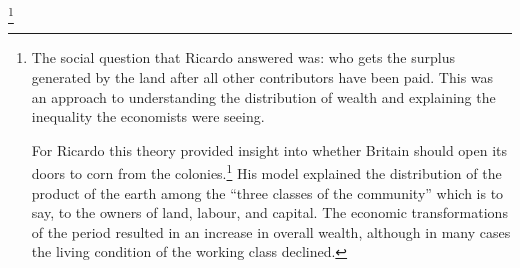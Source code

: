  \footnote{The social question that Ricardo answered was: who gets the surplus generated by the land after all other contributors have been paid. This was an approach to understanding the distribution of wealth and explaining the inequality the economists were seeing. 
 
 For Ricardo this theory provided insight into whether Britain should open its doors to corn from the colonies.\footnote{This was the debate over the Corn Laws (1794-1846), a set duties on grain imports into Britain to protect British agriculture from outside competition. In Britain, ``corn'' was the generic name for cereal crops. The full title of Ricardo's essay was was \textit{An Essay on the Influence of a low Price of Corn on the Profits of Stock, showing the Inexpediency of Restrictions on Importation: With Remarks on Mr Malthus' Two Last Publications: "An Inquiry into the Nature and Progress of Rent," and "The Grounds of an Opinion on the Policy of restricting the Importation of Foreign Corn"}.}
His model  explained the distribution of the product of the earth among the “three classes of the community” which is to say, to the owners of land, labour, and capital.   %
The economic transformations of the period resulted in an increase in overall wealth, although in many cases the living condition of the working class declined.} %

 

